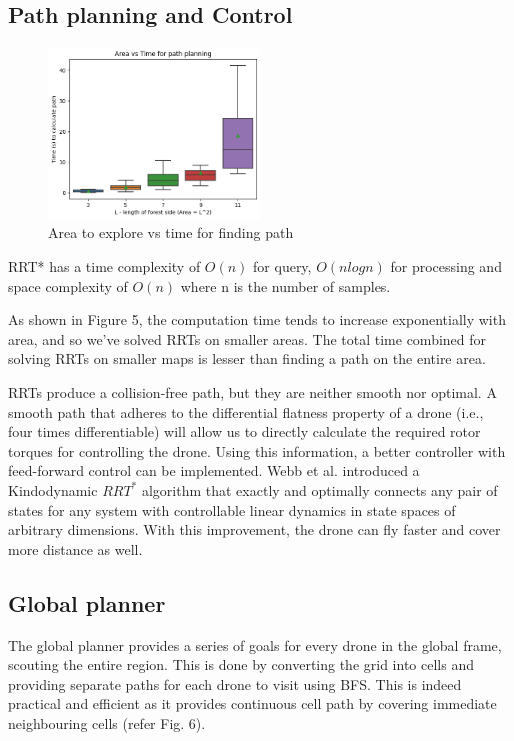 \subsection{Path planning and Control}


\begin{figure}[h]
\centering
\includegraphics[width=0.5\textwidth]{images/time_area.png}
\caption{Area to explore vs time for finding path}
\end{figure}

RRT* has a time complexity of $O(n)$ for query, $O(nlogn)$ for processing and space complexity of $O(n)$ where n is the number of samples.

As shown in Figure 5, the computation time tends to increase exponentially with area, and so we've solved RRTs on smaller areas.
The total time combined for solving RRTs on smaller maps is lesser than finding a path on the entire area.

RRTs produce a collision-free path, but they are neither smooth nor optimal.
A smooth path that adheres to the differential flatness property of a drone (i.e., four times differentiable) will allow us to directly calculate the required rotor torques for controlling the drone.
Using this information, a better controller with feed-forward control can be implemented.
Webb et al. introduced a Kindodynamic $RRT^*$ algorithm that exactly and optimally connects any pair of states for any system with controllable linear dynamics in state spaces of arbitrary dimensions\cite{DBLP:journals/corr/abs-1205-5088}.
With this improvement, the drone can fly faster and cover more distance as well.

 
\subsection{Global planner}

The global planner provides a series of goals for every drone in the global frame, scouting the entire region. This is done by converting the grid into cells and providing separate paths for each drone to visit using BFS. This is indeed practical and efficient as it provides continuous cell path by covering immediate neighbouring cells (refer Fig. 6).

